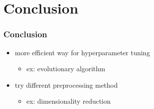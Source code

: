 \documentclass[
	11pt, %
	aspectratio=169, %
]{beamer}
\begin{document}
\section{Conclusion}

\begin{frame}
	\frametitle{Conclusion}

	\begin{itemize}
		\item more efficient way for hyperparameter tuning
		\begin{itemize}
			\item ex: evolutionary algorithm
		\end{itemize}
		\item try different preprocessing method
		\begin{itemize}
			\item ex: dimensionality reduction 
		\end{itemize}
	\end{itemize}
\end{frame}

	

\end{document}
